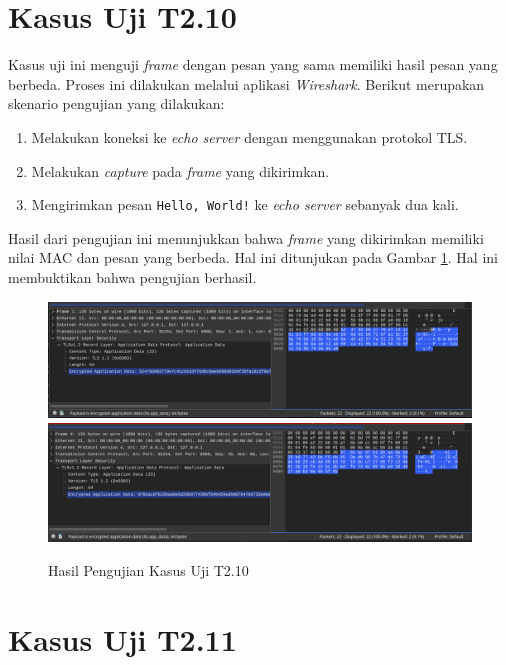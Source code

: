\section{Kasus Uji T2.10}

Kasus uji ini menguji \emph{frame} dengan pesan yang sama memiliki hasil pesan yang berbeda. Proses ini dilakukan melalui aplikasi \emph{Wireshark}. Berikut merupakan skenario pengujian yang dilakukan:

\begin{enumerate}
  \item Melakukan koneksi ke \emph{echo server} dengan menggunakan protokol TLS.
  \item Melakukan \emph{capture} pada \emph{frame} yang dikirimkan.
  \item Mengirimkan pesan \texttt{Hello, World!} ke \emph{echo server} sebanyak dua kali.
\end{enumerate}

Hasil dari pengujian ini menunjukkan bahwa \emph{frame} yang dikirimkan memiliki nilai MAC dan pesan yang berbeda. Hal ini ditunjukan pada Gambar \ref{fig:unit.test.t2.10}. Hal ini membuktikan bahwa pengujian berhasil.

\begin{figure}[ht]
  \centering
  \includegraphics[width=\textwidth]{chapters/res/appendix-4/2.10.1.png}
  \includegraphics[width=\textwidth]{chapters/res/appendix-4/2.10.2.png}
  \caption{Hasil Pengujian Kasus Uji T2.10}
  \label{fig:unit.test.t2.10}
\end{figure}

\section{Kasus Uji T2.11}

